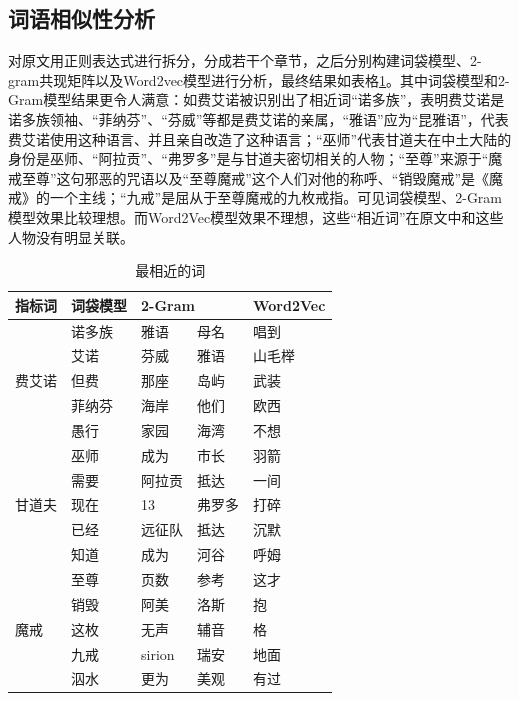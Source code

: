 \documentclass[10pt, a4paper]{article}
\begin{document}
\subsection{词语相似性分析}

对原文用正则表达式进行拆分，分成若干个章节，之后分别构建词袋模型、2-gram共现矩阵以及Word2vec模型进行分析，最终结果如表格\ref{tab:最相近的词}。其中词袋模型和2-Gram模型结果更令人满意：如费艾诺被识别出了相近词“诺多族”，表明费艾诺是诺多族领袖、“菲纳芬”、“芬威”等都是费艾诺的亲属，“雅语”应为“昆雅语”，代表费艾诺使用这种语言、并且亲自改造了这种语言；“巫师”代表甘道夫在中土大陆的身份是巫师、“阿拉贡”、“弗罗多”是与甘道夫密切相关的人物；“至尊”来源于“魔戒至尊”这句邪恶的咒语以及“至尊魔戒”这个人们对他的称呼、“销毁魔戒”是《魔戒》的一个主线；“九戒”是屈从于至尊魔戒的九枚戒指。可见词袋模型、2-Gram模型效果比较理想。而Word2Vec模型效果不理想，这些“相近词”在原文中和这些人物没有明显关联。
\begin{table}[!htbp]
	\centering
	\begin{tabular}{l|l|ll|l}
		\hline
		指标词                  & 词袋模型 & \multicolumn{2}{l|}{2-Gram} & Word2Vec \\ \hline
		\multirow{5}{*}{费艾诺} & 诺多族  & 雅语             & 母名         & 唱到       \\
		& 艾诺   & 芬威             & 雅语         & 山毛榉      \\
		& 但费   & 那座             & 岛屿         & 武装       \\
		& 菲纳芬  & 海岸             & 他们         & 欧西       \\
		& 愚行   & 家园             & 海湾         & 不想       \\ \hline
		\multirow{5}{*}{甘道夫} & 巫师   & 成为             & 市长         & 羽箭       \\
		& 需要   & 阿拉贡            & 抵达         & 一间       \\
		& 现在   & 13             & 弗罗多        & 打碎       \\
		& 已经   & 远征队            & 抵达         & 沉默       \\
		& 知道   & 成为             & 河谷         & 呼姆       \\ \hline
		\multirow{5}{*}{魔戒}  & 至尊   & 页数             & 参考         & 这才       \\
		& 销毁   & 阿美             & 洛斯         & 抱        \\
		& 这枚   & 无声             & 辅音         & 格        \\
		& 九戒   & sirion         & 瑞安         & 地面       \\
		& 泅水   & 更为             & 美观         & 有过       \\ \hline
	\end{tabular}
	\caption{最相近的词}
	\label{tab:最相近的词}
\end{table}
\end{document}

